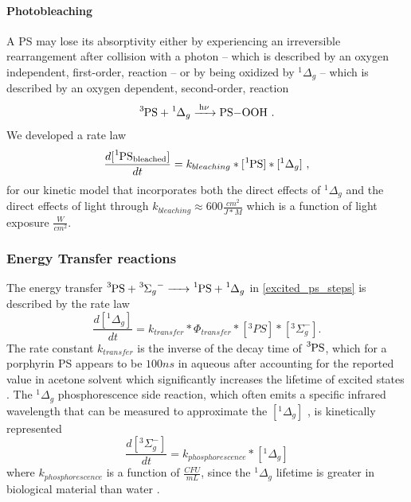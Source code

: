 \paragraph{Photobleaching}
A PS may lose its absorptivity either by experiencing an irreversible rearrangement after collision with a photon -- which is described by an oxygen independent, first-order, reaction \cite{Bonnett1999PhotobleachingStudy,Mang1987PhotobleachingTherapy} -- or by being oxidized by $^1\Delta_g$ -- which is described by an oxygen dependent, second-order, reaction 
\begin{equation}
    \ce{^3PS + ^1\Delta_g ->[h\nu] PS-OOH}~.
\end{equation}
We developed a rate law 
\begin{equation} \label{bleaching_kinetics}
    \frac{d[\ce{^1PS_{bleached}}]}{dt} = k_{bleaching}*[\ce{^1PS}]*[^1\Delta_g]~,
\end{equation}
for our kinetic model that incorporates both the direct effects of $^1\Delta_g$ and the direct effects of light through $k_{bleaching} \approx 600 \frac{cm^2}{J*M}$ \cite{Dysart2005CalculationCells} which is a function of light exposure $\frac{W}{cm^2}$.

\subsubsection{Energy Transfer reactions}
The energy transfer $\ce{^3PS + ^3\Sigma_g^- -> ^1PS + ^1\Delta_g^}$ in \cref{excited_ps_steps} is described by the rate law
\begin{equation} \label{energy_transfer_kinetics}
    \frac{d[^1\Delta_g]}{dt} = k_{transfer}*\Phi_{transfer}*[^3PS]*[^3\Sigma_g^-]. 
\end{equation}
The rate constant $k_{transfer}$ is the inverse of the decay time of $\ce{^3PS}$, which for a porphyrin PS appears to be $100 ns$ in aqueous after accounting for the reported value \cite{Kupper2002KineticsOxygen} in acetone solvent which significantly increases the lifetime of excited states \cite{Spikes1992QuantumUroporphyrin}. The $^1\Delta_g$ phosphorescence side reaction, which often emits a specific infrared wavelength that can be measured to approximate the $[^1\Delta_g]$ \cite{Macpherson1993DirectCentres}, is kinetically represented 
\begin{equation}
    \frac{d[^3\Sigma_g^-]}{dt} = k_{phosphorescence}*[^1\Delta_g]
\end{equation}
where $k_{phosphorescence}$ is a function of $\frac{CFU}{mL}$, since the $^1\Delta_g$ lifetime is greater in biological material \cite{Maisch2007TheBacteria} than water \cite{Baier2005Time-resolvedCells}.

